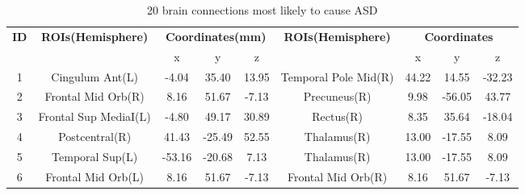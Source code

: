 \documentclass[journal,twoside,web]{ieeecolor}
\begin{document}
\begin{table}
	\centering
	\caption{20 brain connections most likely to cause ASD}
	\label{Table6}
	\tabcolsep=0.45cm
	\begin{tabular*}{\textwidth}{ccccccccc} 
		\toprule
		\multirow{2}{*}{\textbf{ID}} & \multirow{2}{*}{\textbf{ROIs(Hemisphere)}} & \multicolumn{3}{c}{\textbf{\textbf{Coordinates(mm)}}} & \multirow{2}{*}{\textbf{\textbf{ROIs(Hemisphere)}}} & \multicolumn{3}{c}{\textbf{\textbf{\textbf{\textbf{Coordinates}}}}}  \\ 
		\cline{3-5}\cline{7-9}
		&                                            & x      & y      & z                                   &                                                     & x      & y      & z                                                  \\ 
		\midrule
		1                            & Cingulum Ant(L)                            & -4.04  & 35.40  & 13.95                               & Temporal Pole Mid(R)                                & 44.22  & 14.55  & -32.23                                             \\
		2                            & Frontal Mid Orb(R)                         & 8.16   & 51.67  & -7.13                               & Precuneus(R)                                        & 9.98   & -56.05 & 43.77                                              \\
		3                            & Frontal Sup MediaI(L)                      & -4.80  & 49.17  & 30.89                               & Rectus(R)                                           & 8.35   & 35.64  & -18.04                                             \\
		4                            & Postcentral(R)                             & 41.43  & -25.49 & 52.55                               & Thalamus(R)                                         & 13.00  & -17.55 & 8.09                                               \\
		5                            & Temporal Sup(L)                            & -53.16 & -20.68 & 7.13                                & Thalamus(R)                                         & 13.00  & -17.55 & 8.09                                               \\
		6                            & Frontal Mid Orb(L)                         & 8.16   & 51.67  & -7.13                               & Frontal Mid Orb(R)                                  & 8.16   & 51.67  & -7.13                                              \\

\end{tabular*}
\end{table}
\end{document}
